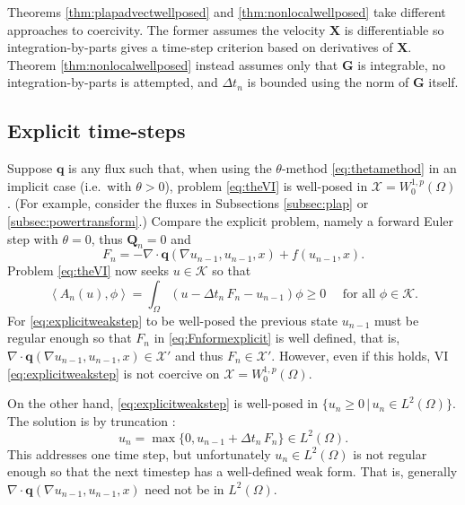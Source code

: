 \documentclass[final,onefignum]{siamart190516}
\newcommand\bq{\mathbf{q}}
\newcommand\bG{\mathbf{G}}
\newcommand\bQ{\mathbf{Q}}
\newcommand\bX{\mathbf{X}}
\newcommand{\Div}{\nabla\cdot}
\newcommand{\grad}{\nabla}
\newcommand{\ip}[2]{\ensuremath{\left<#1,#2\right>}}
\begin{document}
Theorems \ref{thm:plapadvectwellposed} and \ref{thm:nonlocalwellposed} take different approaches to coercivity.  The former assumes the velocity $\bX$ is differentiable so integration-by-parts gives a time-step criterion based on derivatives of $\bX$.  Theorem \ref{thm:nonlocalwellposed} instead assumes only that $\bG$ is integrable, no integration-by-parts is attempted, and $\Delta t_n$ is bounded using the norm of $\bG$ itself.

\subsection{Explicit time-steps} \label{subsec:explicit}   Suppose $\bq$ is any flux such that, when using the $\theta$-method \eqref{eq:thetamethod} in an implicit case (i.e.~with $\theta>0$), problem \eqref{eq:theVI} is well-posed in $\mathcal{X}=W_0^{1,p}(\Omega)$.  (For example, consider the fluxes in Subsections \ref{subsec:plap} or \ref{subsec:powertransform}.)  Compare the explicit problem, namely a forward Euler step with $\theta=0$, thus $\bQ_n=0$ and
\begin{equation}
F_n = - \Div \bq(\grad u_{n-1},u_{n-1},x) + f(u_{n-1},x).  \label{eq:Fnformexplicit}
\end{equation}
Problem \eqref{eq:theVI} now seeks $u\in\mathcal{K}$ so that
\begin{equation}
\ip{A_n(u)}{\phi} = \int_\Omega (u - \Delta t_n\,F_n - u_{n-1})\phi \ge 0 \quad \text{ for all } \phi \in \mathcal{K}.  \label{eq:explicitweakstep}
\end{equation}
For \eqref{eq:explicitweakstep} to be well-posed the previous state $u_{n-1}$ must be regular enough so that $F_n$ in \eqref{eq:Fnformexplicit} is well defined, that is, $\Div \bq(\grad u_{n-1},u_{n-1},x) \in \mathcal{X}'$ and thus $F_n\in\mathcal{X}'$.  However, even if this holds, VI \eqref{eq:explicitweakstep} is not coercive on $\mathcal{X}=W_0^{1,p}(\Omega)$.

On the other hand, \eqref{eq:explicitweakstep} is well-posed in $\{u_n\ge 0\,\big|\,u_n\in L^2(\Omega)\}$.  The solution is by truncation \cite[page 27]{KinderlehrerStampacchia1980}:
\begin{equation}
u_n = \max\{0,u_{n-1} + \Delta t_n\,F_n\} \in L^2(\Omega). \label{eq:explicittruncation}
\end{equation}
This addresses one time step, but unfortunately $u_n \in L^2(\Omega)$ is not regular enough so that the next timestep has a well-defined weak form.  That is, generally $\Div \bq(\grad u_{n-1},u_{n-1},x)$ need not be in $L^2(\Omega)$.
\end{document}
